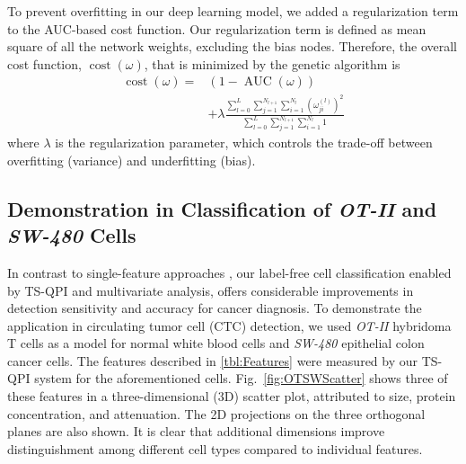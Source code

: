 \documentclass[aps,pra,reprint,longbibliography,superscriptaddress]{revtex4-1}
\DeclareMathOperator{\AUC}{AUC} %
\DeclareMathOperator{\cost}{cost} %
\begin{document}
To prevent overfitting in our deep learning model, we added a regularization term to the AUC-based cost function. Our regularization term is defined as mean square of all the network weights, excluding the bias nodes. Therefore, the overall cost function, $\cost(\omega)$, that is minimized by the genetic algorithm is
\begin{equation}
\begin{split}
\cost(\omega) = & (1 - \AUC(\omega)) \\
& + \lambda \frac{\sum_{l=0}^{L} \sum_{j=1}^{N_{l+1}} \sum_{i=1}^{N_l} (\omega_{ji}^{(l)})^2}{\sum_{l=0}^{L} \sum_{j=1}^{N_{l+1}} \sum_{i=1}^{N_l} 1}
\end{split}
\end{equation}
where $\lambda$ is the regularization parameter, which controls the trade-off between overfitting (variance) and underfitting (bias).

\subsection{Demonstration in Classification of \textit{OT-II} and \textit{SW-480} Cells}

In contrast to single-feature approaches \cite{nagrath2007isolation, vona2000isolation, kling2012beyond}, our label-free cell classification enabled by TS-QPI and multivariate analysis, offers considerable improvements in detection sensitivity and accuracy for cancer diagnosis. To demonstrate the application in circulating tumor cell (CTC) detection, we used \textit{OT-II} hybridoma T cells as a model for normal white blood cells and \textit{SW-480} epithelial colon cancer cells. The features described in \ref{tbl:Features} were measured by our TS-QPI system for the aforementioned cells. Fig.~\ref{fig:OTSWScatter} shows three of these features in a three-dimensional (3D) scatter plot, attributed to size, protein concentration, and attenuation. The 2D projections on the three orthogonal planes are also shown. It is clear that additional dimensions improve distinguishment among different cell types compared to individual features.
\end{document}
